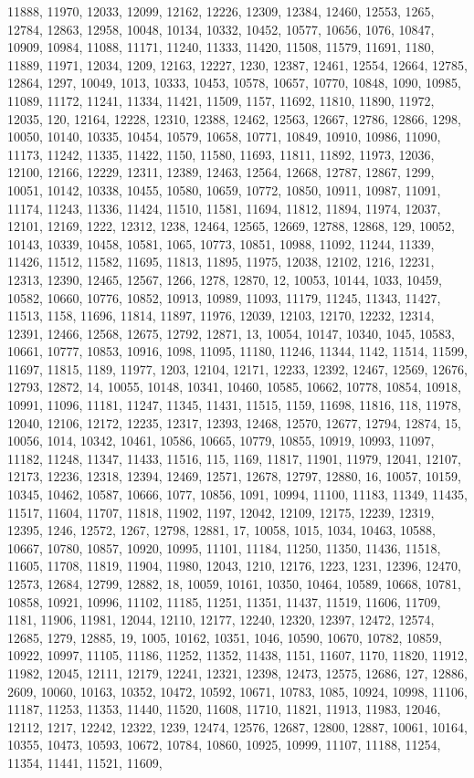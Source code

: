 \documentclass{article} \usepackage{hyperref}
\begin{document}
11888, 11970, 12033, 12099, 12162, 12226, 12309, 12384, 12460, 12553, 1265, 12784, 12863, 12958, 10048, 10134, 10332, 10452, 10577, 10656, 1076, 10847, 10909, 10984, 11088, 11171, 11240, 11333, 11420, 11508, 11579, 11691, 1180, 11889, 11971, 12034, 1209, 12163, 12227, 1230, 12387, 12461, 12554, 12664, 12785, 12864, 1297, 10049, 1013, 10333, 10453, 10578, 10657, 10770, 10848, 1090, 10985, 11089, 11172, 11241, 11334, 11421, 11509, 1157, 11692, 11810, 11890, 11972, 12035, 120, 12164, 12228, 12310, 12388, 12462, 12563, 12667, 12786, 12866, 1298, 10050, 10140, 10335, 10454, 10579, 10658, 10771, 10849, 10910, 10986, 11090, 11173, 11242, 11335, 11422, 1150, 11580, 11693, 11811, 11892, 11973, 12036, 12100, 12166, 12229, 12311, 12389, 12463, 12564, 12668, 12787, 12867, 1299, 10051, 10142, 10338, 10455, 10580, 10659, 10772, 10850, 10911, 10987, 11091, 11174, 11243, 11336, 11424, 11510, 11581, 11694, 11812, 11894, 11974, 12037, 12101, 12169, 1222, 12312, 1238, 12464, 12565, 12669, 12788, 12868, 129, 10052, 10143, 10339, 10458, 10581, 1065, 10773, 10851, 10988, 11092, 11244, 11339, 11426, 11512, 11582, 11695, 11813, 11895, 11975, 12038, 12102, 1216, 12231, 12313, 12390, 12465, 12567, 1266, 1278, 12870, 12, 10053, 10144, 1033, 10459, 10582, 10660, 10776, 10852, 10913, 10989, 11093, 11179, 11245, 11343, 11427, 11513, 1158, 11696, 11814, 11897, 11976, 12039, 12103, 12170, 12232, 12314, 12391, 12466, 12568, 12675, 12792, 12871, 13, 10054, 10147, 10340, 1045, 10583, 10661, 10777, 10853, 10916, 1098, 11095, 11180, 11246, 11344, 1142, 11514, 11599, 11697, 11815, 1189, 11977, 1203, 12104, 12171, 12233, 12392, 12467, 12569, 12676, 12793, 12872, 14, 10055, 10148, 10341, 10460, 10585, 10662, 10778, 10854, 10918, 10991, 11096, 11181, 11247, 11345, 11431, 11515, 1159, 11698, 11816, 118, 11978, 12040, 12106, 12172, 12235, 12317, 12393, 12468, 12570, 12677, 12794, 12874, 15, 10056, 1014, 10342, 10461, 10586, 10665, 10779, 10855, 10919, 10993, 11097, 11182, 11248, 11347, 11433, 11516, 115, 1169, 11817, 11901, 11979, 12041, 12107, 12173, 12236, 12318, 12394, 12469, 12571, 12678, 12797, 12880, 16, 10057, 10159, 10345, 10462, 10587, 10666, 1077, 10856, 1091, 10994, 11100, 11183, 11349, 11435, 11517, 11604, 11707, 11818, 11902, 1197, 12042, 12109, 12175, 12239, 12319, 12395, 1246, 12572, 1267, 12798, 12881, 17, 10058, 1015, 1034, 10463, 10588, 10667, 10780, 10857, 10920, 10995, 11101, 11184, 11250, 11350, 11436, 11518, 11605, 11708, 11819, 11904, 11980, 12043, 1210, 12176, 1223, 1231, 12396, 12470, 12573, 12684, 12799, 12882, 18, 10059, 10161, 10350, 10464, 10589, 10668, 10781, 10858, 10921, 10996, 11102, 11185, 11251, 11351, 11437, 11519, 11606, 11709, 1181, 11906, 11981, 12044, 12110, 12177, 12240, 12320, 12397, 12472, 12574, 12685, 1279, 12885, 19, 1005, 10162, 10351, 1046, 10590, 10670, 10782, 10859, 10922, 10997, 11105, 11186, 11252, 11352, 11438, 1151, 11607, 1170, 11820, 11912, 11982, 12045, 12111, 12179, 12241, 12321, 12398, 12473, 12575, 12686, 127, 12886, 2609, 10060, 10163, 10352, 10472, 10592, 10671, 10783, 1085, 10924, 10998, 11106, 11187, 11253, 11353, 11440, 11520, 11608, 11710, 11821, 11913, 11983, 12046, 12112, 1217, 12242, 12322, 1239, 12474, 12576, 12687, 12800, 12887, 10061, 10164, 10355, 10473, 10593, 10672, 10784, 10860, 10925, 10999, 11107, 11188, 11254, 11354, 11441, 11521, 11609, 
\end{document}
